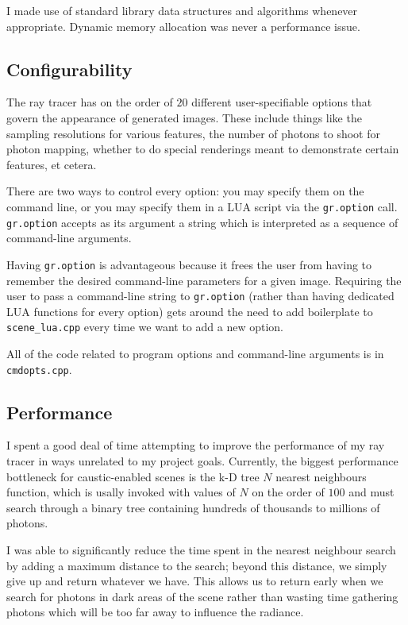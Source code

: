 \documentclass{article}
\begin{document}
I made use of standard library data structures and algorithms whenever
appropriate. Dynamic memory allocation was never a performance issue.

\subsection{Configurability}

The ray tracer has on the order of $20$ different user-specifiable options that
govern the appearance of generated images. These include things like the sampling
resolutions for various features, the number of photons to shoot for photon mapping,
whether to do special renderings meant to demonstrate certain features, et
cetera.

There are two ways to control every option: you may specify them on the
command line, or you may specify them in a LUA script via the {\tt gr.option}
call. {\tt gr.option} accepts as its argument a string which is interpreted as a
sequence of command-line arguments.

Having {\tt gr.option} is advantageous because it frees the user from having to
remember the desired command-line parameters for a given image. Requiring the
user to pass a command-line string to {\tt gr.option} (rather than having
dedicated LUA functions for every option) gets around the need to
add boilerplate to {\tt scene\_lua.cpp} every time we want to add a new
option.

All of the code related to program options and command-line arguments is in
{\tt cmdopts.cpp}.

\subsection{Performance}

I spent a good deal of time attempting to improve the performance of my ray
tracer in ways unrelated to my project goals. Currently, the biggest performance
bottleneck for caustic-enabled scenes is the k-D tree $N$ nearest neighbours
function, which is usally invoked with values of $N$ on the order of $100$ and
must search through a binary tree containing hundreds of thousands to millions
of photons.

I was able to significantly reduce the time spent in the nearest neighbour
search by adding a maximum distance to the search; beyond this distance, we simply give up
and return whatever we have. This allows us to return early when we search for
photons in dark areas of the scene rather than wasting time gathering photons
which will be too far away to influence the radiance.
\end{document}

